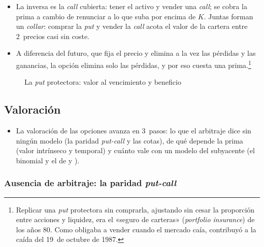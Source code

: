 \documentclass[11pt]{article}
\begin{document}
\begin{itemize}
\begin{itemize}
  \end{itemize}
\item La inversa es la \emph{call} cubierta: tener el activo y vender una \emph{call}; se cobra la prima a cambio de renunciar a lo que suba por encima de $K$. Juntas forman un \emph{collar}: comprar la \emph{put} y vender la \emph{call} acota el valor de la cartera entre 2~precios casi sin coste.
\item A diferencia del futuro, que fija el precio y elimina a la vez las pérdidas y las ganancias, la opción elimina solo las pérdidas, y por eso cuesta una prima.\footnote{Replicar una \emph{put} protectora sin comprarla, ajustando sin cesar la proporción entre acciones y liquidez, era el «seguro de carteras» (\emph{portfolio insurance}) de los años 80. Como obligaba a vender cuando el mercado caía, contribuyó a la caída del 19~de octubre de 1987\nocite{Brady1988Report}.}
\end{itemize}

\begin{figure}[H]
\centering
\caption{La \emph{put} protectora: valor al vencimiento y beneficio}\label{fig:put-protectora}
\end{figure}

\subsection{Valoración}\label{sec:valoracion-opciones}

\begin{itemize}
\item La valoración de las opciones avanza en 3~pasos: lo que el arbitraje dice sin ningún modelo (la paridad \emph{put-call} y las cotas), de qué depende la prima (valor intrínseco y temporal) y cuánto vale con un modelo del subyacente (el binomial y el de  y ).
\end{itemize}

\subsubsection{Ausencia de arbitraje: la paridad \emph{put-call}}\label{sec:put-call}
\end{document}
